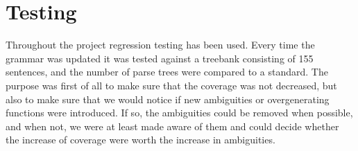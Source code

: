 \documentclass{report}
\begin{document}
%
%
%
%
%

\section{Testing}
Throughout the project regression testing has been used. Every time the grammar was updated
it was tested against a treebank consisting of 155 sentences, and the number of
parse trees were compared to a standard.
The purpose was first of all to
make sure that the coverage was not decreased, but also to make sure that we
would notice if new ambiguities or overgenerating functions were introduced.
If so, the ambiguities could be removed when possible, and when not, we were at least made
aware of them and could decide whether the increase of coverage were worth the
increase in ambiguities.
\end{document}
